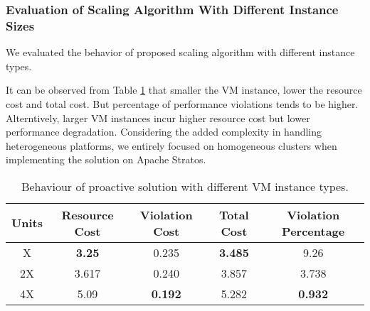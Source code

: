 \subsubsection{Evaluation of Scaling Algorithm With Different Instance Sizes}
We evaluated the behavior of proposed scaling algorithm with different instance types.

It can be observed from Table \ref{dif_instance} that smaller the VM instance, lower the resource cost and total cost. But percentage of performance violations tends to be higher. Alterntively, larger VM instances incur higher resource cost but lower performance degradation. Considering the added complexity in handling heterogeneous platforms, we entirely focused on homogeneous clusters when implementing the solution on Apache Stratos.

\begin{table}
\caption{Behaviour of proactive solution with different VM instance types.}
\centering
\label{dif_instance}
\begin{tabular}{|c|c|c|c|c|}
\hline
Units
& Resource Cost
& Violation Cost
& Total Cost
& Violation Percentage
\\ \hline
X
&\textbf{3.25} 
&0.235
&\textbf{3.485}
&9.26
\\ \hline
2X
&3.617
&0.240
&3.857
&3.738
\\ \hline
4X
&5.09
&\textbf{0.192}
&5.282
&\textbf{0.932}
\\ \hline
\end{tabular}
\end{table}